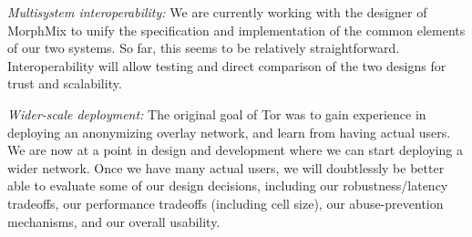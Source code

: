 \documentclass[times,10pt,twocolumn]{article}
\begin{document}
\emph{Multisystem interoperability:} We are currently working with the
designer of MorphMix to unify the specification and implementation of
the common elements of our two systems. So far, this seems
to be relatively straightforward.  Interoperability will allow testing
and direct comparison of the two designs for trust and scalability.

\emph{Wider-scale deployment:} The original goal of Tor was to
gain experience in deploying an anonymizing overlay network, and
learn from having actual users.  We are now at a point in design
and development where we can start deploying a wider network.  Once
we have many actual users, we will doubtlessly be better
able to evaluate some of our design decisions, including our
robustness/latency tradeoffs, our performance tradeoffs (including
cell size), our abuse-prevention mechanisms, and
our overall usability.






\end{document}
